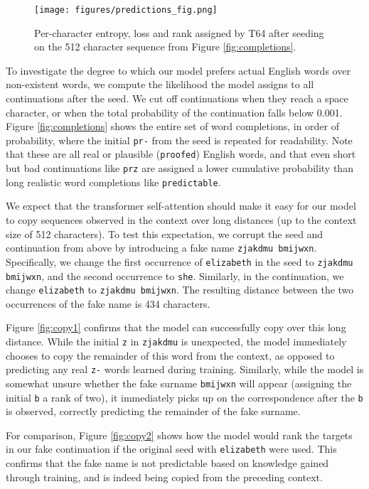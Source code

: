 \documentclass[letterpaper]{article}
\newcommand{\bigmodel}{\textsc{T64}}
\begin{document}
\begin{figure*}[ht]
    \centering
    \texttt{[image: figures/predictions\_fig.png]}
    \caption{Per-character entropy, loss and rank assigned by \bigmodel{} after seeding on the 512 character sequence from Figure \ref{fig:completions}.}
    \label{fig:predictions}
\end{figure*}

To investigate the degree to which our model prefers actual English words over non-existent words, we compute the likelihood the model assigns to all continuations after the seed. We cut off continuations when they reach a space character, or when the total probability of the continuation falls below 0.001. Figure \ref{fig:completions} shows the entire set of word completions, in order of probability, where the initial \texttt{pr-} from the seed is repeated for readability. Note that these are all real or plausible (\texttt{proofed}) English words, and that even short but bad continuations like \texttt{prz} are assigned a lower cumulative probability than long realistic word completions like \texttt{predictable}.


We expect that the transformer self-attention should make it easy for our model to copy sequences observed in the context over long distances (up to the context size of 512 characters). To test this expectation, we corrupt the seed and continuation from above by introducing a fake name \texttt{zjakdmu bmijwxn}. Specifically, we change the first occurrence of \texttt{elizabeth} in the seed to \texttt{zjakdmu bmijwxn}, and the second occurrence to \texttt{she}. Similarly, in the continuation, we change \texttt{elizabeth} to \texttt{zjakdmu bmijwxn}. The resulting distance between the two occurrences of the fake name is 434 characters.

Figure \ref{fig:copy1} confirms that the model can successfully copy over this long distance. While the initial \texttt{z} in \texttt{zjakdmu} is unexpected, the model immediately chooses to copy the remainder of this word from the context, as opposed to predicting any real \texttt{z-} words learned during training. Similarly, while the model is somewhat unsure whether the fake surname \texttt{bmijwxn} will appear (assigning the initial \texttt{b} a rank of two), it immediately picks up on the correspondence after the \texttt{b} is observed, correctly predicting the remainder of the fake surname.

For comparison, Figure \ref{fig:copy2} shows how the model would rank the targets in our fake continuation if the original seed with \texttt{elizabeth} were used. This confirms that the fake name is not predictable based on knowledge gained through training, and is indeed being copied from the preceding context.
\end{document}
